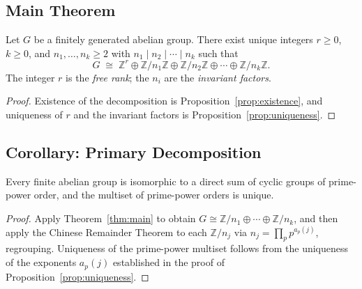 \subsection{Main Theorem}

\begin{theorem}
    \label{thm:main}
    Let $G$ be a finitely generated abelian group. There exist unique integers
    $r \ge 0$, $k \ge 0$, and $n_1, \dots, n_k \ge 2$ with
    $n_1 \mid n_2 \mid \cdots \mid n_k$ such that
    \[
        G \;\cong\; \mathbb{Z}^r \oplus \mathbb{Z}/n_1\mathbb{Z} \oplus \mathbb{Z}/n_2\mathbb{Z}
        \oplus \cdots \oplus \mathbb{Z}/n_k\mathbb{Z}.
    \]
    The integer $r$ is the \emph{free rank}; the $n_i$ are the
    \emph{invariant factors}.
\end{theorem}
\begin{proof}
    Existence of the decomposition is Proposition~\ref{prop:existence}, and
    uniqueness of $r$ and the invariant factors is
    Proposition~\ref{prop:uniqueness}.
\end{proof}

\subsection{Corollary: Primary Decomposition}

\begin{corollary}
    \label{cor:primary}
    Every finite abelian group is isomorphic to a direct sum of cyclic groups
    of prime-power order, and the multiset of prime-power orders is unique.
\end{corollary}
\begin{proof}
    Apply Theorem~\ref{thm:main} to obtain $G \cong \mathbb{Z}/n_1 \oplus \cdots
    \oplus \mathbb{Z}/n_k$, and then apply the Chinese Remainder Theorem to each
    $\mathbb{Z}/n_j$ via $n_j = \prod_p p^{a_p(j)}$, regrouping. Uniqueness of the
    prime-power multiset follows from the uniqueness of the exponents
    $a_p(j)$ established in the proof of Proposition~\ref{prop:uniqueness}.
\end{proof}
